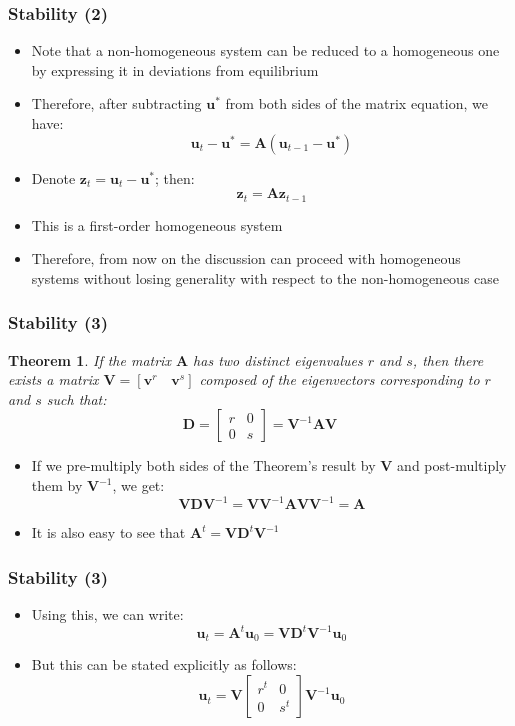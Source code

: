 \documentclass[10pt,usenames,dvipsnames]{beamer}
\theoremstyle{plain}
\newtheorem{thm}{Theorem}
\theoremstyle{definition}
\begin{document}
\begin{frame}[fragile]
\frametitle{Stability (2)}
\begin{itemize}
	\item Note that a non-homogeneous system can be reduced to a homogeneous one by expressing it in deviations from equilibrium
	\item Therefore, after subtracting $\mathbf{u}^{*}$ from both sides of the matrix equation, we have:
	\[
		\mathbf{u}_{t} - \mathbf{u}^{*}  = \mathbf{A}(\mathbf{u}_{t-1} - \mathbf{u}^{*})
	\]
	\item Denote $\mathbf{z}_{t} = \mathbf{u}_{t} - \mathbf{u}^{*}$; then:
	\[
		\mathbf{z}_{t}  = \mathbf{A}\mathbf{z}_{t-1}
	\]
	\item This is a first-order homogeneous system
	\item Therefore, from now on the discussion can proceed with homogeneous systems without losing generality with respect to the non-homogeneous case
\end{itemize}
\end{frame}

\begin{frame}[fragile]
\frametitle{Stability (3)}
\begin{thm}
	If the matrix $ \mathbf{A} $ has two distinct eigenvalues $r$ and $s$, then there exists a matrix $ \mathbf{V} = [\mathbf{v}^{r} \quad \mathbf{v}^{s}]$ composed of the eigenvectors corresponding to $r$ and $s$ such that:
	\[
		\mathbf{D} = 
		\left[\begin{matrix}
			r & 0\\
			0 & s
		\end{matrix}\right] = 
		\mathbf{V}^{-1}\mathbf{AV}
	\]
\end{thm}
\begin{itemize}
	\item If we pre-multiply both sides of the Theorem's result by $\mathbf{V}$ and post-multiply them by $\mathbf{V}^{-1}$, we get:
	\[
		\mathbf{V}\mathbf{D}\mathbf{V}^{-1} = \mathbf{V}\mathbf{V}^{-1}\mathbf{AV}\mathbf{V}^{-1} = \mathbf{A}
	\]
	\item It is also easy to see that $\mathbf{A}^{t} = \mathbf{V}\mathbf{D}^{t}\mathbf{V}^{-1}$
\end{itemize}
\end{frame}

\begin{frame}[fragile]
\frametitle{Stability (3)}
\begin{itemize}
	\item Using this, we can write:
	\[
		\mathbf{u}_{t} = \mathbf{A}^{t}\mathbf{u}_{0} = \mathbf{V}\mathbf{D}^{t}\mathbf{V}^{-1}\mathbf{u}_{0}
	\]
	\item But this can be stated explicitly as follows:
	\[
		\mathbf{u}_{t} = \mathbf{V}
		\left[\begin{matrix}
			r^{t} & 0\\
			0 & s^{t}
		\end{matrix}\right]		
		\mathbf{V}^{-1}\mathbf{u}_{0}
	\]
\end{itemize}
\end{frame}
\end{document}

